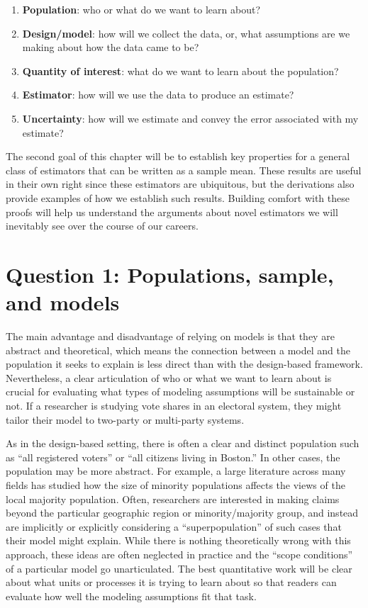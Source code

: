 \documentclass[
  letterpaper,
  DIV=11,
  numbers=noendperiod]{scrreprt}
\providecommand{\tightlist}{%
  \setlength{\itemsep}{0pt}\setlength{\parskip}{0pt}}\usepackage{longtable,booktabs,array}
\theoremstyle{definition}
\theoremstyle{definition}
\theoremstyle{plain}
\theoremstyle{remark}
\begin{document}
\begin{enumerate}
\def\labelenumi{\arabic{enumi}.}
\tightlist
\item
  \textbf{Population}: who or what do we want to learn about?
\item
  \textbf{Design/model}: how will we collect the data, or, what
  assumptions are we making about how the data came to be?
\item
  \textbf{Quantity of interest}: what do we want to learn about the
  population?\\
\item
  \textbf{Estimator}: how will we use the data to produce an estimate?
\item
  \textbf{Uncertainty}: how will we estimate and convey the error
  associated with my estimate?
\end{enumerate}

The second goal of this chapter will be to establish key properties for
a general class of estimators that can be written as a sample mean.
These results are useful in their own right since these estimators are
ubiquitous, but the derivations also provide examples of how we
establish such results. Building comfort with these proofs will help us
understand the arguments about novel estimators we will inevitably see
over the course of our careers.

\hypertarget{question-1-populations-sample-and-models}{%
\section{Question 1: Populations, sample, and
models}\label{question-1-populations-sample-and-models}}

The main advantage and disadvantage of relying on models is that they
are abstract and theoretical, which means the connection between a model
and the population it seeks to explain is less direct than with the
design-based framework. Nevertheless, a clear articulation of who or
what we want to learn about is crucial for evaluating what types of
modeling assumptions will be sustainable or not. If a researcher is
studying vote shares in an electoral system, they might tailor their
model to two-party or multi-party systems.

As in the design-based setting, there is often a clear and distinct
population such as ``all registered voters'' or ``all citizens living in
Boston.'' In other cases, the population may be more abstract. For
example, a large literature across many fields has studied how the size
of minority populations affects the views of the local majority
population. Often, researchers are interested in making claims beyond
the particular geographic region or minority/majority group, and instead
are implicitly or explicitly considering a ``superpopulation'' of such
cases that their model might explain. While there is nothing
theoretically wrong with this approach, these ideas are often neglected
in practice and the ``scope conditions'' of a particular model go
unarticulated. The best quantitative work will be clear about what units
or processes it is trying to learn about so that readers can evaluate
how well the modeling assumptions fit that task.
\end{document}
